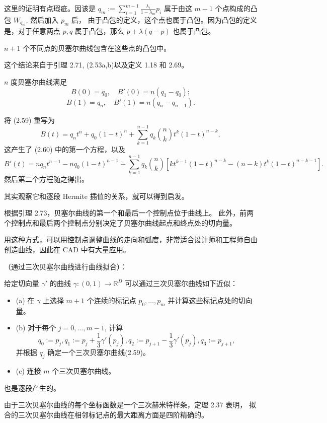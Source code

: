 \documentclass[a4paper]{ctexart}
\begin{document}
{这里的证明有点瑕疵。因该是 $q_m := \sum_{i=1}^{m-1} \frac{\lambda_i}{1-\lambda_m} p_i$ 属于由这 $m - 1$ 个点构成的凸包 $W_{q_m}$. 然后加入 $p_m$ 后，
由于凸包的定义，这个点也属于凸包。因为凸包的定义是，对于任意两点 $p, q$ 属于凸包，那么 $p + \lambda (q - p)$ 也属于凸包。

$n + 1$ 个不同点的贝塞尔曲线包含在这些点的凸包中。

 这个结论来自于引理 2.71, (2.53a,b)以及定义 1.18 和 2.69。

$n$ 度贝塞尔曲线满足
$$
B(0) = q_0, \quad B'(0) = n(q_1 - q_0);
$$
$$
B(1) = q_n, \quad B'(1) = n(q_n - q_{n - 1}).
$$

 将 (2.59) 重写为
$$
B(t) = q_n t^n + q_0 (1 - t)^n + \sum_{k=1}^{n-1} q_k \binom{n}{k} t^k (1 - t)^{n-k},
$$
这产生了 (2.60) 中的第一个方程，以及
$$
B'(t) = nq_n t^{n-1} - nq_0 (1 - t)^{n-1} + \sum_{k=1}^{n-1} q_k \binom{n}{k} \left[ kt^{k-1} (1 - t)^{n-k} - (n - k)t^k (1 - t)^{n-k-1} \right].
$$
然后第二个方程随之得出。

其实观察它和逐段 Hermite 插值的关系，就可以得到启发。

 根据引理 2.73，贝塞尔曲线的第一个和最后一个控制点位于曲线上。
此外，前两个控制点和最后两个控制点分别决定了贝塞尔曲线起点和终点处的切向量。

用这种方式，可以用控制点调整曲线的走向和弧度，非常适合设计师和工程师自由创造曲线，因此在 CAD 中有大量应用。

（通过三次贝塞尔曲线进行曲线拟合）：

给定切向量 $\gamma'$ 的曲线 $\gamma : (0, 1) \rightarrow \mathbb{R}^D$ 可以通过三次贝塞尔曲线如下近似：
\begin{itemize}
  \item (a) 在 $\gamma$ 上选择 $m + 1$ 个连续的标记点 $p_0, \ldots, p_m$ 并计算这些标记点处的切向量。
  \item (b) 对于每个 $j = 0, \ldots, m - 1$, 计算 
  $$
  q_0 := p_j, q_1 := p_j + \frac{1}{3} \gamma'(p_j), q_2 := p_{j + 1} - \frac{1}{3} \gamma'(p_j), q_3 := p_{j + 1},
  $$ 
  并根据 $q_j$ 确定一个三次贝塞尔曲线(2.59)。
  \item  (c) 连接 $m$ 个三次贝塞尔曲线。
\end{itemize}

也是逐段产生的。

 由于三次贝塞尔曲线的每个坐标函数是一个三次赫米特样条，定理 2.37 表明，
拟合的三次贝塞尔曲线在相邻标记点的最大距离方面是四阶精确的。

}
\end{document}
